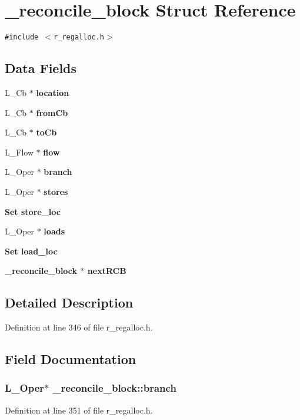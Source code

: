 \section{\_\-reconcile\_\-block Struct Reference}
\label{struct__reconcile__block}
{\tt \#include $<$r\_\-regalloc.h$>$}

\subsection*{Data Fields}
\begin{CompactItemize}
\item 
L\_\-Cb $\ast$ \bf{location}
\item 
L\_\-Cb $\ast$ \bf{from\-Cb}
\item 
L\_\-Cb $\ast$ \bf{to\-Cb}
\item 
L\_\-Flow $\ast$ \bf{flow}
\item 
L\_\-Oper $\ast$ \bf{branch}
\item 
L\_\-Oper $\ast$ \bf{stores}
\item 
\bf{Set} \bf{store\_\-loc}
\item 
L\_\-Oper $\ast$ \bf{loads}
\item 
\bf{Set} \bf{load\_\-loc}
\item 
\bf{\_\-reconcile\_\-block} $\ast$ \bf{next\-RCB}
\end{CompactItemize}


\subsection{Detailed Description}




Definition at line 346 of file r\_\-regalloc.h.

\subsection{Field Documentation}
\subsubsection{\setlength{\rightskip}{0pt plus 5cm}L\_\-Oper$\ast$ \bf{\_\-reconcile\_\-block::branch}}\label{struct__reconcile__block_ef525d2592abb652c706a0700df125bb}




Definition at line 351 of file r\_\-regalloc.h.

